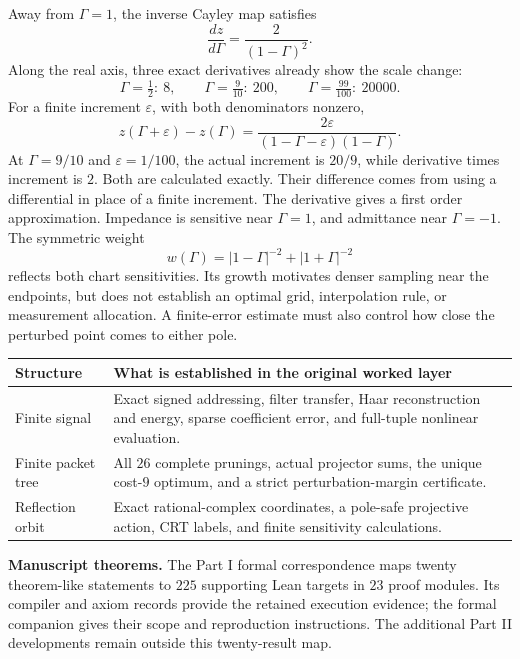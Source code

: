 Away from $\Gamma=1$, the inverse Cayley map satisfies
\[
\frac{dz}{d\Gamma}=\frac2{(1-\Gamma)^2}.
\]
Along the real axis, three exact derivatives already show the scale change:
\[
\Gamma=\tfrac12:\ 8,\qquad
\Gamma=\tfrac9{10}:\ 200,\qquad
\Gamma=\tfrac{99}{100}:\ 20000.
\]
For a finite increment $\varepsilon$, with both denominators nonzero,
\[
z(\Gamma+\varepsilon)-z(\Gamma)
=\frac{2\varepsilon}{(1-\Gamma-\varepsilon)(1-\Gamma)}.
\]
At $\Gamma=9/10$ and $\varepsilon=1/100$, the actual increment is $20/9$, while derivative times increment is $2$. Both are calculated exactly. Their difference comes from using a differential in place of a finite increment. The derivative gives a first order approximation.
Impedance is sensitive near $\Gamma=1$, and admittance near $\Gamma=-1$. The symmetric weight
\[
w(\Gamma)=|1-\Gamma|^{-2}+|1+\Gamma|^{-2}
\]
reflects both chart sensitivities. Its growth motivates denser sampling near the endpoints, but does not establish an optimal grid, interpolation rule, or measurement allocation. A finite-error estimate must also control how close the perturbed point comes to either pole.

\begin{tabularx}{\linewidth}{@{}p{.24\linewidth}X@{}}
\toprule
Structure & What is established in the original worked layer\\\midrule
Finite signal & Exact signed addressing, filter transfer, Haar reconstruction and energy, sparse coefficient error, and full-tuple nonlinear evaluation.\\
Finite packet tree & All $26$ complete prunings, actual projector sums, the unique cost-$9$ optimum, and a strict perturbation-margin certificate.\\
Reflection orbit & Exact rational-complex coordinates, a pole-safe projective action, CRT labels, and finite sensitivity calculations.\\\bottomrule
\end{tabularx}
\textbf{Manuscript theorems.} The Part I formal correspondence maps twenty theorem-like statements to $225$ supporting Lean targets in $23$ proof modules. Its compiler and axiom records provide the retained execution evidence; the formal companion gives their scope and reproduction instructions. The additional Part II developments remain outside this twenty-result map.

